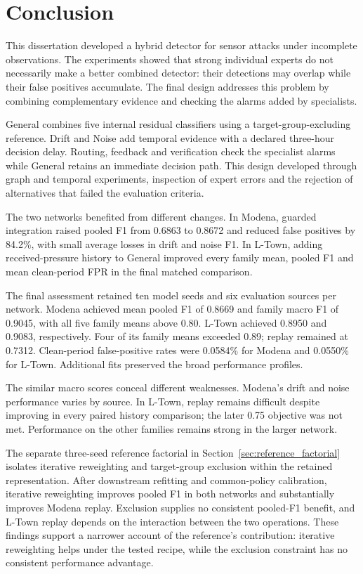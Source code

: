 \chapter{Conclusion}
\label{ch:conclusion}

This dissertation developed a hybrid detector for sensor attacks under incomplete observations. The experiments showed that strong individual experts do not necessarily make a better combined detector: their detections may overlap while their false positives accumulate. The final design addresses this problem by combining complementary evidence and checking the alarms added by specialists.

General combines five internal residual classifiers using a target-group-excluding reference. Drift and Noise add temporal evidence with a declared three-hour decision delay. Routing, feedback and verification check the specialist alarms while General retains an immediate decision path. This design developed through graph and temporal experiments, inspection of expert errors and the rejection of alternatives that failed the evaluation criteria.

The two networks benefited from different changes. In Modena, guarded integration raised pooled F1 from 0.6863 to 0.8672 and reduced false positives by 84.2\%, with small average losses in drift and noise F1. In L-Town, adding received-pressure history to General improved every family mean, pooled F1 and mean clean-period FPR in the final matched comparison.

The final assessment retained ten model seeds and six evaluation sources per network. Modena achieved mean pooled F1 of 0.8669 and family macro F1 of 0.9045, with all five family means above 0.80. L-Town achieved 0.8950 and 0.9083, respectively. Four of its family means exceeded 0.89; replay remained at 0.7312. Clean-period false-positive rates were 0.0584\% for Modena and 0.0550\% for L-Town. Additional fits preserved the broad performance profiles.

The similar macro scores conceal different weaknesses. Modena's drift and noise performance varies by source. In L-Town, replay remains difficult despite improving in every paired history comparison; the later 0.75 objective was not met. Performance on the other families remains strong in the larger network.

The separate three-seed reference factorial in Section~\ref{sec:reference_factorial} isolates iterative reweighting and target-group exclusion within the retained representation. After downstream refitting and common-policy calibration, iterative reweighting improves pooled F1 in both networks and substantially improves Modena replay. Exclusion supplies no consistent pooled-F1 benefit, and L-Town replay depends on the interaction between the two operations. These findings support a narrower account of the reference's contribution: iterative reweighting helps under the tested recipe, while the exclusion constraint has no consistent performance advantage.

